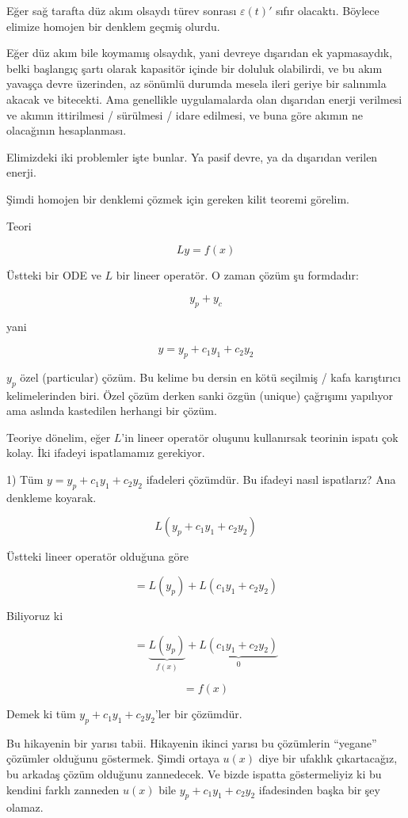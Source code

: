 \documentclass[12pt,fleqn]{article}\usepackage{../../common}
\begin{document}
Eğer sağ tarafta düz akım olsaydı türev sonrası $\varepsilon(t)'$ sıfır
olacaktı. Böylece elimize homojen bir denklem geçmiş olurdu.

Eğer düz akım bile koymamış olsaydık, yani devreye dışarıdan ek yapmasaydık,
belki başlangıç şartı olarak kapasitör içinde bir doluluk olabilirdi, ve bu akım
yavaşça devre üzerinden, az sönümlü durumda mesela ileri geriye bir
salınımla akacak ve bitecekti. Ama genellikle uygulamalarda olan dışarıdan
enerji verilmesi ve akımın ittirilmesi / sürülmesi / idare edilmesi, ve buna
göre akımın ne olacağının hesaplanması.

Elimizdeki iki problemler işte bunlar. Ya pasif devre, ya da dışarıdan verilen
enerji.

Şimdi homojen bir denklemi çözmek için gereken kilit teoremi görelim. 

Teori

$$ Ly = f(x) $$

Üstteki bir ODE ve $L$ bir lineer operatör. O zaman çözüm şu formdadır:

$$ y_p + y_c $$

yani

$$ y = y_p + c_1y_1 + c_2y_2 $$

$y_p$ özel (particular) çözüm. Bu kelime bu dersin en kötü seçilmiş / kafa
karıştırıcı kelimelerinden biri. Özel çözüm derken sanki özgün (unique)
çağrışımı yapılıyor ama aslında kastedilen herhangi bir çözüm.

Teoriye dönelim, eğer $L$'in lineer operatör oluşunu kullanırsak teorinin ispatı
çok kolay. İki ifadeyi ispatlamamız gerekiyor.

1) Tüm $y = y_p + c_1y_1 + c_2y_2$ ifadeleri çözümdür. Bu ifadeyi nasıl
ispatlarız? Ana denkleme koyarak. 

$$ L(y_p + c_1y_1 + c_2y_2) $$

Üstteki lineer operatör olduğuna göre

$$ = L(y_p) + L(c_1y_1 + c_2y_2) $$

Biliyoruz ki

$$ = \underbrace{L(y_p)}_{f(x)} + \underbrace{L(c_1y_1 + c_2y_2)}_{0} $$

$$ =f(x) $$

Demek ki tüm $y_p + c_1y_1 + c_2y_2$'ler bir çözümdür. 

Bu hikayenin bir yarısı tabii. Hikayenin ikinci yarısı bu çözümlerin ``yegane''
çözümler olduğunu göstermek. Şimdi ortaya $u(x)$ diye bir ufaklık çıkartacağız,
bu arkadaş çözüm olduğunu zannedecek. Ve bizde ispatta göstermeliyiz ki bu
kendini farklı zanneden $u(x)$ bile $y_p + c_1y_1 + c_2y_2$ ifadesinden başka
bir şey olamaz.
\end{document}
